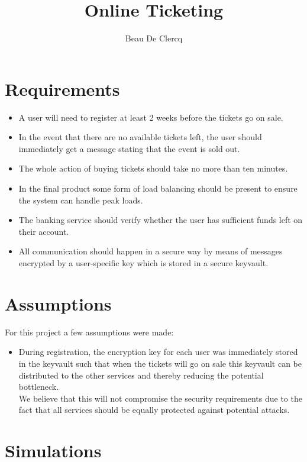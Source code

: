 \documentclass[10pt,a4paper,twocolumn]{article}
\author{Beau De Clercq}
\title{Online Ticketing}
\begin{document}
	
\maketitle	
\begin{abstract}

\end{abstract}

\section*{Requirements}
\begin{itemize}
	\item A user will need to register at least 2 weeks before the tickets go on sale.
	\item In the event that there are no available tickets left, the user should immediately get a message stating that the event is sold out.
	\item The whole action of buying tickets should take no more than ten minutes.
	\item In the final product some form of load balancing should be present to ensure the system can handle peak loads.
	\item The banking service should verify whether the user has sufficient funds left on their account.
	\item All communication should happen in a secure way by means of messages encrypted by a user-specific key which is stored in a secure keyvault.
\end{itemize}
\section{Assumptions}
For this project a few assumptions were made:
\begin{itemize}
	\item During registration, the encryption key for each user was immediately stored in the keyvault such that when the tickets will go on sale this keyvault can be distributed to the other services and thereby reducing the potential bottleneck.\\
	We believe that this will not compromise the security requirements due to the fact that all services should be equally protected against potential attacks.
\end{itemize}

\section{Simulations}
\end{document}
